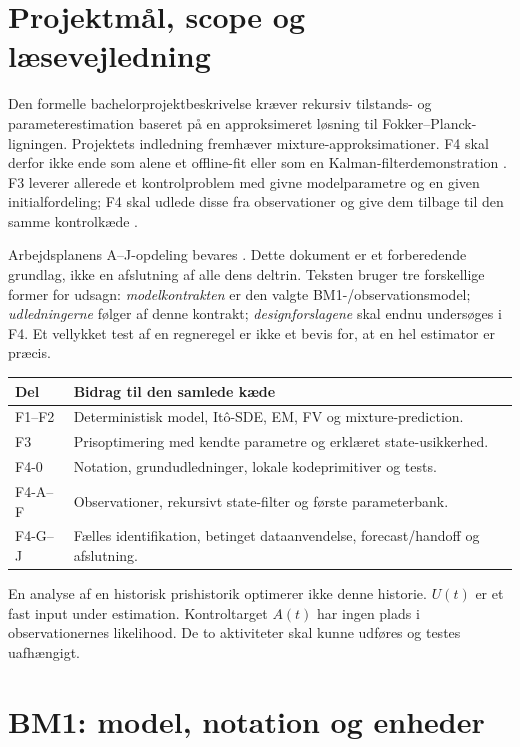 \section{Projektmål, scope og læsevejledning}
Den formelle bachelorprojektbeskrivelse kræver rekursiv tilstands- og parameterestimation baseret på en approksimeret løsning til Fokker--Planck-ligningen. Projektets indledning fremhæver mixture-approksimationer. F4 skal derfor ikke ende som alene et offline-fit eller som en Kalman-filterdemonstration \cite{project}. F3 leverer allerede et kontrolproblem med givne modelparametre og en given initialfordeling; F4 skal udlede disse fra observationer og give dem tilbage til den samme kontrolkæde \cite{repo}.

Arbejdsplanens A--J-opdeling bevares \cite{plan}. Dette dokument er et forberedende grundlag, ikke en afslutning af alle dens deltrin. Teksten bruger tre forskellige former for udsagn: \emph{modelkontrakten} er den valgte BM1-/observationsmodel; \emph{udledningerne} følger af denne kontrakt; \emph{designforslagene} skal endnu undersøges i F4. Et vellykket test af en regneregel er ikke et bevis for, at en hel estimator er præcis.

\begin{tabularx}{\linewidth}{@{}lX@{}}
\toprule
Del & Bidrag til den samlede kæde\\\midrule
F1--F2 & Deterministisk model, Itô-SDE, EM, FV og mixture-prediction.\\
F3 & Prisoptimering med kendte parametre og erklæret state-usikkerhed.\\
F4-0 & Notation, grundudledninger, lokale kodeprimitiver og tests.\\
F4-A--F & Observationer, rekursivt state-filter og første parameterbank.\\
F4-G--J & Fælles identifikation, betinget dataanvendelse, forecast/handoff og afslutning.\\
\bottomrule
\end{tabularx}

En analyse af en historisk prishistorik optimerer ikke denne historie. \(U(t)\) er et fast input under estimation. Kontroltarget \(A(t)\) har ingen plads i observationernes likelihood. De to aktiviteter skal kunne udføres og testes uafhængigt.

\section{BM1: model, notation og enheder}
